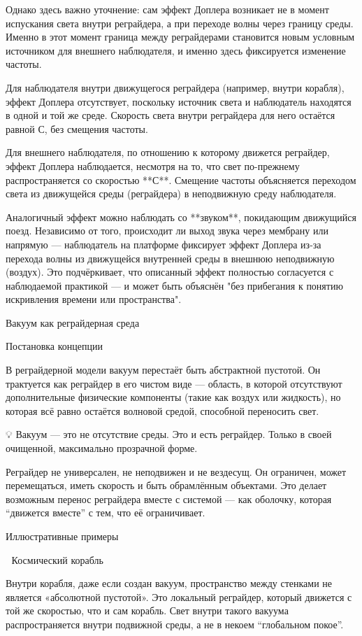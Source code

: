 \documentclass[12pt]{article}
\begin{document}
Однако здесь важно уточнение: сам эффект Доплера возникает не в момент испускания света внутри реграйдера, а при переходе волны через границу среды. Именно в этот момент граница между реграйдерами становится новым условным источником для внешнего наблюдателя, и именно здесь фиксируется изменение частоты.

Для наблюдателя внутри движущегося реграйдера (например, внутри корабля), эффект Доплера отсутствует, поскольку источник света и наблюдатель находятся в одной и той же среде. Скорость света внутри реграйдера для него остаётся равной С, без смещения частоты.

Для внешнего наблюдателя, по отношению к которому движется реграйдер, эффект Доплера наблюдается, несмотря на то, что свет по-прежнему распространяется со скоростью **С**. Смещение частоты объясняется переходом света из движущейся среды (реграйдера) в неподвижную среду наблюдателя.

Аналогичный эффект можно наблюдать со **звуком**, покидающим движущийся поезд. Независимо от того, происходит ли выход звука через мембрану или напрямую — наблюдатель на платформе фиксирует эффект Доплера из-за перехода волны из движущейся внутренней среды в внешнюю неподвижную (воздух). Это подчёркивает, что описанный эффект полностью согласуется с наблюдаемой практикой — и может быть объяснён "без прибегания к понятию искривления времени или пространства".


Вакуум как реграйдерная среда

Постановка концепции

В реграйдерной модели вакуум перестаёт быть абстрактной пустотой. Он трактуется как реграйдер в его чистом виде — область, в которой отсутствуют дополнительные физические компоненты (такие как воздух или жидкость), но которая всё равно остаётся волновой средой, способной переносить свет.

💡 Вакуум — это не отсутствие среды. Это и есть реграйдер. Только в своей очищенной, максимально прозрачной форме.

Реграйдер не универсален, не неподвижен и не вездесущ. Он ограничен, может перемещаться, иметь скорость и быть обрамлённым объектами. Это делает возможным перенос реграйдера вместе с системой — как оболочку, которая “движется вместе” с тем, что её ограничивает.

Иллюстративные примеры

🚀 Космический корабль

Внутри корабля, даже если создан вакуум, пространство между стенками не является «абсолютной пустотой». Это локальный реграйдер, который движется с той же скоростью, что и сам корабль. Свет внутри такого вакуума распространяется внутри подвижной среды, а не в некоем “глобальном покое”.
\end{document}
